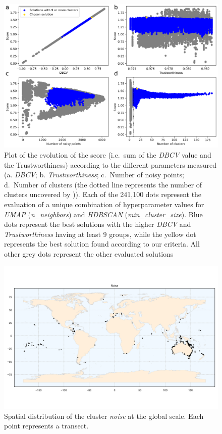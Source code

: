 \begin{figure}
\hypertarget{fig:chap2figS1}{%
\centering
\includegraphics{03-Chapitre2/figures/supplementary/03-solutions-distributions.png}
\caption{Plot of the evolution of the score (i.e.~sum of the \emph{DBCV}
value and the Trustworthiness) according to the different parameters
measured (a. \emph{DBCV}; b. \emph{Trustworthiness}; c.~Number of noisy
points; d.~Number of clusters (the dotted line represents the number of
clusters uncovered by \textcite{Cresswell_2017})). Each of the 241,100
dots represent the evaluation of a unique combination of hyperparameter
values for \emph{UMAP} (\emph{n\_neighbors}) and \emph{HDBSCAN}
(\emph{min\_cluster\_size}). Blue dots represent the best solutions
with the higher \emph{DBCV} and \emph{Trustworthiness} having at least 9
groups, while the yellow dot represents the best solution found
according to our criteria. All other grey dots represent the other
evaluated solutions}\label{fig:chap2figS1}
}
\end{figure}

\begin{figure}
\hypertarget{fig:chap2figS2}{%
\centering
\includegraphics{03-Chapitre2/figures/supplementary/06-spatial-cluster_distribution_cluster_-1.png}
\caption{Spatial distribution of the cluster \emph{noise} at the global
scale. Each point represents a transect.}\label{fig:chap2figS2}
}
\end{figure}

